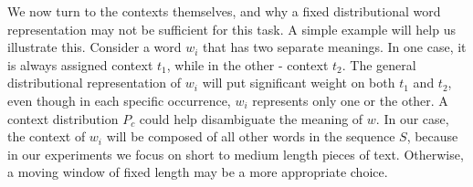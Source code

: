 
We now turn to the contexts themselves, and why a fixed distributional
word representation may not be sufficient for this task. A simple example will
help us illustrate this. Consider a word $w_i$ that has
two separate meanings. In one case, it is always assigned context $t_1$,
while in the other - context $t_2$. The general distributional
representation of $w_i$ will put significant weight on both $t_1$ and
$t_2$, even though in each specific occurrence, $w_i$ represents only one
or the other. A context distribution $P_c$ could help disambiguate
the meaning of $w$. In our case, the context of $w_i$ will be composed of
all other words in the sequence $S$, because in our experiments we
focus on short to medium length pieces of text. Otherwise, a moving
window of fixed length may be a more appropriate choice.

